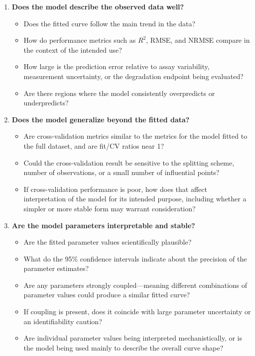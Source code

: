 \begin{enumerate}
    \item \textbf{Does the model describe the observed data well?}
    \begin{itemize}
        \item Does the fitted curve follow the main trend in the data?
        \item How do performance metrics such as $R^2$, RMSE, and NRMSE compare in the context of the intended use?
        \item How large is the prediction error relative to assay variability, measurement uncertainty, or the degradation endpoint being evaluated?
        \item Are there regions where the model consistently overpredicts or underpredicts?
    \end{itemize}

    \item \textbf{Does the model generalize beyond the fitted data?}
    \begin{itemize}
        \item Are cross-validation metrics similar to the metrics for the model fitted to the full dataset, and are fit/CV ratios near 1?
        \item Could the cross-validation result be sensitive to the splitting scheme, number of observations, or a small number of influential points?
        \item If cross-validation performance is poor, how does that affect interpretation of the model for its intended purpose, including whether a simpler or more stable form may warrant consideration?
    \end{itemize}

    \item \textbf{Are the model parameters interpretable and stable?}
    \begin{itemize}
        \item Are the fitted parameter values scientifically plausible?
        \item What do the 95\% confidence intervals indicate about the precision of the parameter estimates?
        \item Are any parameters strongly coupled---meaning different combinations of parameter values could produce a similar fitted curve?
        \item If coupling is present, does it coincide with large parameter uncertainty or an identifiability caution?
        \item Are individual parameter values being interpreted mechanistically, or is the model being used mainly to describe the overall curve shape?
    \end{itemize}


\end{enumerate}
